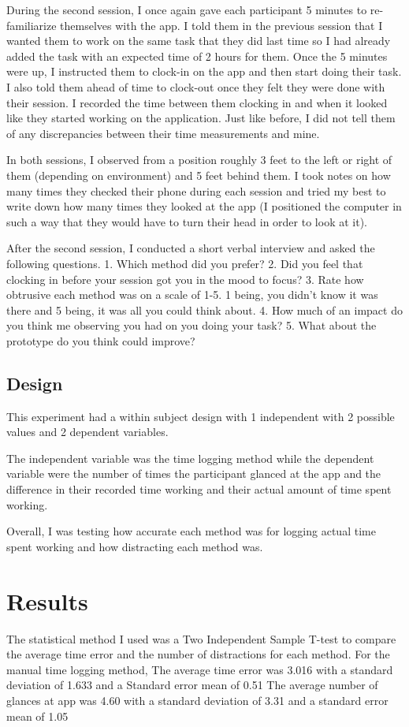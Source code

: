 \documentclass[sigconf]{acmart}
\begin{document}
During the second session, I once again gave each participant 5 minutes to re-familiarize themselves with the app. I told them in the previous session that I wanted them to work on the same task that they did last time so I had already added the task with an expected time of 2 hours for them. Once the 5 minutes were up, I instructed them to clock-in on the app and then start doing their task. I also told them ahead of time to clock-out once they felt they were done with their session. I recorded the time between them clocking in and when it looked like they started working on the application. Just like before, I did not tell them of any discrepancies between their time measurements and mine.

In both sessions, I observed from a position roughly 3 feet to the left or right of them (depending on environment) and 5 feet behind them. I took notes on how many times they checked their phone during each session and tried my best to write down how many times they looked at the app (I positioned the computer in such a way that they would have to turn their head in order to look at it).

After the second session, I conducted a short verbal interview and asked the following questions.
1. Which method did you prefer?
2. Did you feel that clocking in before your session got you in the mood to focus?
3. Rate how obtrusive each method was on a scale of 1-5. 1 being, you didn't know it was there and 5 being, it was all you could think about. 
4. How much of an impact do you think me observing you had on you doing your task?
5. What about the prototype do you think could improve?



\subsection{Design}
This experiment had a within subject design with 1 independent with 2 possible values and 2 dependent variables.

The independent variable was the time logging method while the dependent variable were the number of times the participant glanced at the app and the difference in their recorded time working and their actual amount of time spent working.

Overall, I was testing how accurate each method was for logging actual time spent working and how distracting each method was.


\section{Results}
The statistical method I used was a Two Independent Sample T-test to compare the average time error and the number of distractions for each method. 
For the manual time logging method, 
    The average time error was 3.016 with a standard deviation of 1.633 and a Standard error mean of 0.51
    The average number of glances at app was 4.60 with a standard deviation of 3.31 and a standard error mean of 1.05
\end{document}
